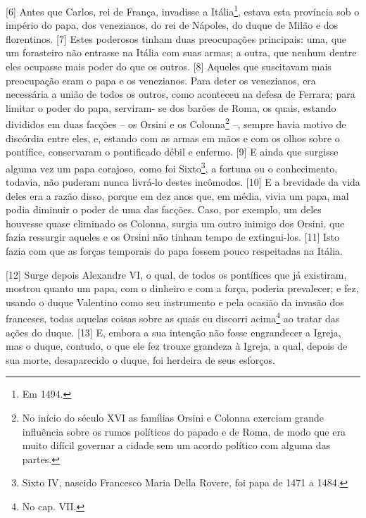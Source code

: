 {[}6{]} Antes que Carlos, rei de França, invadisse a Itália\footnote{Em
  1494.}, estava esta província sob o império do papa, dos venezianos,
do rei de Nápoles, do duque de Milão e dos florentinos. {[}7{]} Estes
poderosos tinham duas preocupações principais: uma, que um forasteiro
não entrasse na Itália com suas armas; a outra, que nenhum dentre eles
ocupasse mais poder do que os outros. {[}8{]} Aqueles que suscitavam
mais preocupação eram o papa e os venezianos. Para deter os venezianos,
era necessária a união de todos os outros, como aconteceu na defesa de
Ferrara; para limitar o poder do papa, serviram- se dos barões de Roma,
os quais, estando divididos em duas facções -- os Orsini e os
Colonna\footnote{No início do século XVI as famílias Orsini e Colonna
  exerciam grande influência sobre os rumos políticos do papado e de
  Roma, de modo que era muito difícil governar a cidade sem um acordo
  político com alguma das partes.} --, sempre havia motivo de discórdia
entre eles, e, estando com as armas em mãos e com os olhos sobre o
pontífice, conservaram o pontificado débil e enfermo. {[}9{]} E ainda
que surgisse alguma vez um papa corajoso, como foi Sixto\footnote{Sixto
  IV, nascido Francesco Maria Della Rovere, foi papa de 1471 a 1484.}, a
fortuna ou o conhecimento, todavia, não puderam nunca livrá-lo destes
incômodos. {[}10{]} E a brevidade da vida deles era a razão disso,
porque em dez anos que, em média, vivia um papa, mal podia diminuir o
poder de uma das facções. Caso, por exemplo, um deles houvesse quase
eliminado os Colonna, surgia um outro inimigo dos Orsini, que fazia
ressurgir aqueles e os Orsini não tinham tempo de extingui-los. {[}11{]}
Isto fazia com que as forças temporais do papa fossem pouco respeitadas
na Itália.

{[}12{]} Surge depois Alexandre VI, o qual, de todos os pontífices que
já existiram, mostrou quanto um papa, com o dinheiro e com a força,
poderia prevalecer; e fez, usando o duque Valentino como seu instrumento
e pela ocasião da invasão dos franceses, todas aquelas coisas sobre as
quais eu discorri acima\footnote{No cap. VII.} ao tratar das ações do
duque. {[}13{]} E, embora a sua intenção não fosse engrandecer a Igreja,
mas o duque, contudo, o que ele fez trouxe grandeza à Igreja, a qual,
depois de sua morte, desaparecido o duque, foi herdeira de seus
esforços.

